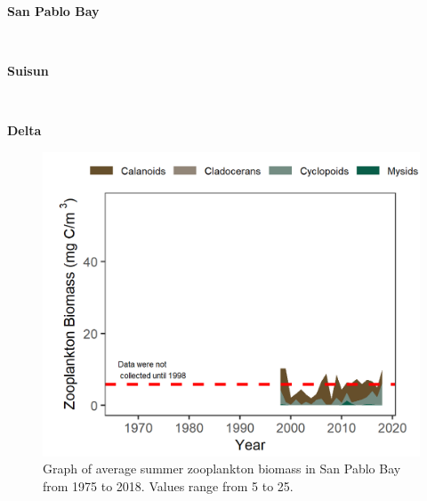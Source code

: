\documentclass[
]{book}
\begin{document}
\begin{panel-grid}

\begin{columns-nocenter}

\begin{column800}

\textbf{San Pablo Bay}

\end{column800}

\begin{column40}

~

\end{column40}

\begin{column800}

\textbf{Suisun}

\end{column800}

\begin{column40}

~

\end{column40}

\begin{column800}

\textbf{Delta}

\end{column800}

\end{columns-nocenter}

\begin{columns-nocenter}

\begin{column800}

\begin{expand}

\begin{figure}
\includegraphics[width=15.25in]{figures/zoops_splsummer} \caption{Graph of average summer zooplankton biomass in San Pablo Bay from 1975 to 2018. Values range from 5 to 25.}\label{fig:unnamed-chunk-70}
\end{figure}


\end{expand}
\end{column800}
\end{columns-nocenter}
\end{panel-grid}
\end{document}
